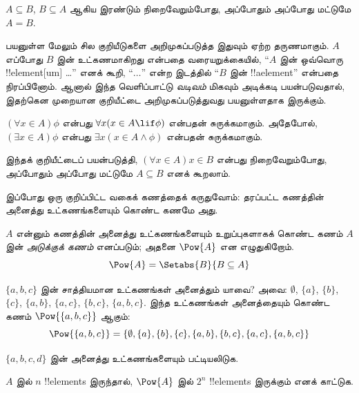 \documentclass[../../../include/open-logic-section]{subfiles}
\begin{document}
\begin{prop}
$A \subseteq B$, $B \subseteq A$ ஆகிய இரண்டும் நிறைவேறும்போது,
அப்போதும் அப்போது மட்டுமே $A = B$.
\end{prop}

பயனுள்ள மேலும் சில குறியீடுகளை அறிமுகப்படுத்த இதுவும் ஏற்ற தருணமாகும்.
$A$ எப்போது $B$ இன் உட்கணமாகிறது என்பதை வரையறுக்கையில்,
``$A$ இன் ஒவ்வொரு !!{element}[um] \dots'' எனக் கூறி,
``$\dots$'' என்ற இடத்தில் ``$B$ இன் !!a{element}'' என்பதை நிரப்பினோம்.
ஆனால் இந்த வெளிப்பாட்டு \emph{வடிவம்} மிகவும் அடிக்கடி பயன்படுவதால்,
இதற்கென முறையான குறியீட்டை அறிமுகப்படுத்துவது பயனுள்ளதாக இருக்கும்.

\begin{defn}
$(\forall x \in A)\phi$ என்பது $\forall x(x \in A \lif
\phi)$ என்பதன் சுருக்கமாகும். அதேபோல், $(\exists x \in A)\phi$ என்பது
$\exists x(x \in A \land \phi)$ என்பதன் சுருக்கமாகும்.
\end{defn}

இந்தக் குறியீட்டைப் பயன்படுத்தி, $(\forall x \in A)x \in B$
என்பது நிறைவேறும்போது, அப்போதும் அப்போது மட்டுமே $A \subseteq B$
எனக் கூறலாம்.

இப்போது ஒரு குறிப்பிட்ட வகைக் கணத்தைக் கருதுவோம்:
தரப்பட்ட கணத்தின் அனைத்து உட்கணங்களையும் கொண்ட கணமே அது.

\begin{defn}[அடுக்குக் கணம்]
$A$ என்னும் கணத்தின் அனைத்து உட்கணங்களையும் உறுப்புகளாகக் கொண்ட கணம்
$A$ இன் \emph{அடுக்குக் கணம்} எனப்படும்; அதனை $\Pow{A}$ என எழுதுகிறோம்.
  \[
    \Pow{A} = \Setabs{B}{B \subseteq A}
  \]
\end{defn}

\begin{ex}
$\{ a, b, c \}$ இன் சாத்தியமான உட்கணங்கள் அனைத்தும் யாவை?
அவை: $\emptyset$, $\{a \}$, $\{b\}$, $\{c\}$, $\{a, b\}$,
$\{a, c\}$, $\{b, c\}$, $\{a, b, c\}$.
இந்த உட்கணங்கள் அனைத்தையும் கொண்ட கணம் $\Pow{\{a,b,c\}}$ ஆகும்:
\[
\Pow{\{ a, b, c \}} = \{\emptyset, \{a \}, \{b\}, \{c\}, \{a, b\},
\{b, c\}, \{a, c\}, \{a, b, c\}\}
\]
\end{ex}

\begin{prob}
$\{a, b, c, d\}$ இன் அனைத்து உட்கணங்களையும் பட்டியலிடுக.
\end{prob}

\begin{prob}
$A$ இல் $n$ !!{element}s இருந்தால், $\Pow{A}$ இல் $2^n$
!!{element}s இருக்கும் எனக் காட்டுக.
\end{prob}
\end{document}
